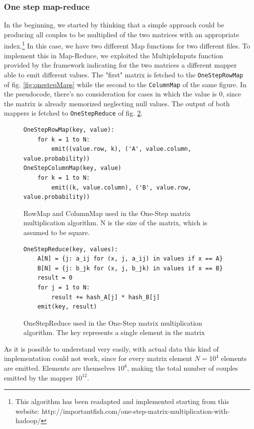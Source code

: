 \subsubsection{One step map-reduce}
In the beginning, we started by thinking that a simple approach could be producing all
couples to be multiplied of the two matrices with an appropriate index.\footnote{This algorithm
has been readapted and implemented starting from this website: http://importantfish.com/one-step-matrix-multiplication-with-hadoop/}
In this case, we have two different Map functions for two different files. To implement this in Map-Reduce, we exploited
the MultipleInputs function provided by the framework indicating for the two matrices a different mapper able
to emit different values.
The "first" matrix is fetched to the \texttt{OneStepRowMap} of fig. \ref{fig:onestepMaps} while the second to the \texttt{ColumnMap} of the same figure. In the pseudocode, there's no consideration for cases in which the value is 0, since the
matrix is already memorized neglecting null values.
The output of both mappers is fetched to \texttt{OneStepReduce} of fig. \ref{fig:onestepReduce}.
\begin{figure}
\begin{verbatim}
OneStepRowMap(key, value):
    for k = 1 to N:
        emit((value.row, k), ('A', value.column, value.probability))
OneStepColumnMap(key, value)
    for k = 1 to N:
        emit((k, value.column), ('B', value.row, value.probability))
\end{verbatim}
\caption{RowMap and ColumnMap used in the One-Step matrix multiplication algorithm. N is the size of the matrix, which is assumed to be square.}
\label{fig:onestep}
\end{figure}

\begin{figure}
\begin{verbatim}
OneStepReduce(key, values):
    A[N] = {j: a_ij for (x, j, a_ij) in values if x == A}
    B[N] = {j: b_jk for (x, j, b_jk) in values if x == B}
    result = 0
    for j = 1 to N:
        result += hash_A[j] * hash_B[j]
    emit(key, result)
\end{verbatim}
\caption{OneStepReduce used in the One-Step matrix multiplication algorithm. The key represents a single element in the matrix}
\label{fig:onestepReduce}
\end{figure}
As it is possible to understand very easily, with actual data this kind of implementation could not
work, since for every matrix element $N=10^4$ elements are emitted. Elements
are themselves $10^8$, making the total number of couples emitted by the mapper $10^12$.

